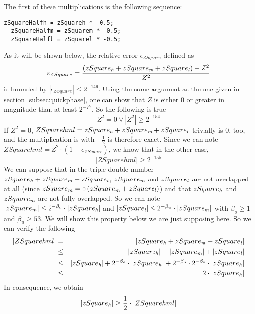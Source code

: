The first of these multiplications is the following sequence:
\begin{lstlisting}[caption={Multiplication of triple-double $\circ\left( Z \cdot Z \right)$ by $-\frac{1}{2}$},firstnumber=99]
  zSquareHalfh = zSquareh * -0.5;
  zSquareHalfm = zSquarem * -0.5;
  zSquareHalfl = zSquarel * -0.5;
\end{lstlisting}
As it will be shown below, the relative error $\epsilon_{ZSquare}$ defined as
$$\varepsilon_{ZSquare} = \frac{\left( zSquare_{\mathit{h}} + zSquare_{\mathit{m}} + zSquare_{\mathit{l}} \right) - Z^2}{Z^2}$$
is bounded by $\left \vert \epsilon_{ZSquare} \right \vert \leq 2^{-149}$.
Using the same argument as the one given in section \ref{subsec:quickphase}, one can show that $Z$ is either $0$ 
or greater in magnitude than at least $2^{-77}$. So the following is true
$$Z^2 = 0 \lor \left \vert Z^2 \right \vert \geq 2^{-154}$$
If $Z^2=0$, $ZSquarehml = zSquare_{\mathit{h}} + zSquare_{\mathit{m}} + zSquare_{\mathit{l}}$ trivially is $0$, too, and the multiplication is 
with $-\frac{1}{2}$ is therefore exact. 
Since we can note $ZSquarehml = Z^2 \cdot \left( 1 + \epsilon_{ZSquare} \right)$, we know that in the other case, 
$$\left \vert ZSquarehml \right \vert \geq 2^{-155}$$
We can suppose that in the triple-double number $zSquare_{\mathit{h}} + zSquare_{\mathit{m}} + zSquare_{\mathit{l}}$, $zSquare_{\mathit{m}}$ and 
$zSquare_{\mathit{l}}$ are not overlapped at all (since $zSquare_{\mathit{m}} = \circ \left( zSquare_{\mathit{m}} + zSquare_{\mathit{l}} \right)$) 
and that $zSquare_{\mathit{h}}$ and $zSquare_{\mathit{m}}$ are not fully overlapped.
So we can note $\left \vert zSquare_{\mathit{m}} \right \vert \leq 2^{-\beta_o} \cdot \left \vert zSquare_{\mathit{h}} \right \vert$ and
$\left \vert zSquare_{\mathit{l}} \right \vert \leq 2^{-\beta_u} \cdot \left \vert zSquare_{\mathit{m}} \right \vert$ with $\beta_o \geq 1$ and 
$\beta_u \geq 53$.
We will show this property below we are just supposing here.
So we can verify the following
\begin{eqnarray*}
\left \vert ZSquarehml \right \vert & = & \left \vert zSquare_{\mathit{h}} + zSquare_{\mathit{m}} + zSquare_{\mathit{l}} \right \vert \\
& \leq & \left \vert zSquare_{\mathit{h}} \right \vert + \left \vert zSquare_{\mathit{m}} \right \vert + \left \vert zSquare_{\mathit{l}} \right \vert \\
& \leq & \left \vert zSquare_{\mathit{h}} \right \vert + 
2^{-\beta_o} \cdot \left \vert zSquare_{\mathit{h}} \right \vert + 
2^{-\beta_o} \cdot 2^{-\beta_u} \cdot \left \vert zSquare_{\mathit{h}} \right \vert \\
& \leq & 2 \cdot \left \vert zSquare_{\mathit{h}} \right \vert 
\end{eqnarray*}
In consequence, we obtain
$$\left \vert zSquare_{\mathit{h}} \right \vert \geq \frac{1}{2} \cdot \left \vert ZSquarehml \right \vert$$
